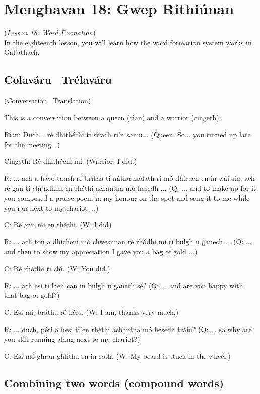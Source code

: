 \section{Menghavan 18: Gwep Rithi\'{u}nan}
(\textit{Lesson 18: Word Formation})\\

In the eighteenth lesson, you will learn how the word formation system works in Gal'{a}thach.

\subsection{Colav\'{a}ru \textendash\ Tr\'{e}lav\'{a}ru}
(Conversation \textendash\ Translation)

This is a conversation between a queen (r\'{\i}an) and a warrior (cingeth).

R\'{\i}an: Duch...  r\'{e} dhith\'{e}chi ti s\'{\i}rach ri'n samu...
(Queen: So... you turned up late for the meeting...)

Cingeth: R\'{e} dhith\'{e}chi mi.
(Warrior: I did.)

R: ... ach a h\'{a}v\'{o} tanch r\'{e} br\'{\i}tha ti n\'{a}thu'm\'{o}lath ri m\'{o} dhiruch en in w\'{a}i-sin, ach r\'{e} gan ti ch\'{\i} adhim en rh\'{e}thi achantha m\'{o} hesedh ...
(Q: ... and to make up for it you composed a praise poem in my honour on the spot and sang it to me while you ran next to my chariot ...)

C: R\'{e} gan mi en rh\'{e}thi.
(W: I did)

R: ... ach ton a dhich\'{e}ni m\'{o} chwesunan r\'{e} rh\'{o}dhi mi ti bulgh u ganech ... 
(Q: ... and then to show my appreciation I gave you a bag of gold ...)

C: R\'{e} rh\'{o}dhi ti ch\'{\i}.
(W: You did.)

R: ... ach esi ti l\'{a}en can in bulgh u ganech s\'{e}?
(Q: ... and are you happy with that bag of gold?)

C: Esi mi, br\'{a}thu r\'{e} h\'{e}lu.
(W: I am, thanks very much.)

R: ... duch, p\'{e}ri a hesi ti en rh\'{e}thi achantha m\'{o} hesedh tr\'{a}iu?
(Q: ... so why are you still running along next to my chariot?)

C: Esi m\'{o} ghran ghl\'{\i}thu en in roth.
(W: My beard is stuck in the wheel.)

\subsection{Combining two words (compound words)}


